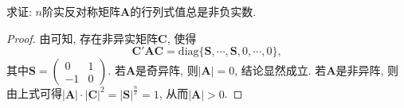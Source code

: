 \documentclass[../../main.tex]{subfiles}%
\begin{document}
\begin{proposition}\label{proposition:实反称矩阵的行列式必非负}
求证: $n$阶实反对称矩阵$\boldsymbol{A}$的行列式值总是非负实数.
\end{proposition}
\begin{proof}
由可知, 存在非异实矩阵$\boldsymbol{C}$, 使得
\[
\boldsymbol{C}'\boldsymbol{A}\boldsymbol{C}=\text{diag}\{\boldsymbol{S}, \cdots, \boldsymbol{S}, 0, \cdots, 0\},
\]
其中$\boldsymbol{S}=\begin{pmatrix}
0 & 1 \\
-1 & 0
\end{pmatrix}$. 若$\boldsymbol{A}$是奇异阵, 则$|\boldsymbol{A}| = 0$, 结论显然成立. 若$\boldsymbol{A}$是非异阵, 则由上式可得$|\boldsymbol{A}|\cdot|\boldsymbol{C}|^2 = |\boldsymbol{S}|^{\frac{n}{2}} = 1$, 从而$|\boldsymbol{A}|>0$. 
\end{proof}
\end{document}
